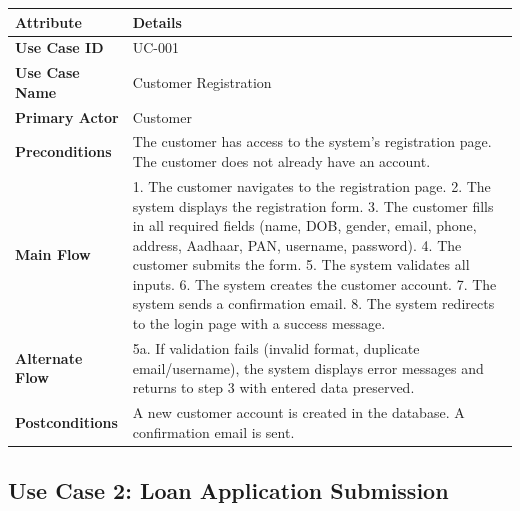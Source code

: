 \documentclass[12pt,a4paper,oneside]{report}
\begin{document}
\begin{table}[htbp]
\centering
\small
\begin{tabularx}{\textwidth}{l l}
\toprule
\textbf{Attribute} & \textbf{Details} \\
\midrule
\textbf{Use Case ID} & UC-001 \\
\textbf{Use Case Name} & Customer Registration \\
\textbf{Primary Actor} & Customer \\
\textbf{Preconditions} & The customer has access to the system's registration page. The customer does not already have an account. \\
\textbf{Main Flow} & 1. The customer navigates to the registration page. 2. The system displays the registration form. 3. The customer fills in all required fields (name, DOB, gender, email, phone, address, Aadhaar, PAN, username, password). 4. The customer submits the form. 5. The system validates all inputs. 6. The system creates the customer account. 7. The system sends a confirmation email. 8. The system redirects to the login page with a success message. \\
\textbf{Alternate Flow} & 5a. If validation fails (invalid format, duplicate email/username), the system displays error messages and returns to step 3 with entered data preserved. \\
\textbf{Postconditions} & A new customer account is created in the database. A confirmation email is sent. \\
\bottomrule
\end{tabularx}
\end{table}

\subsection{Use Case 2: Loan Application Submission}
\end{document}
